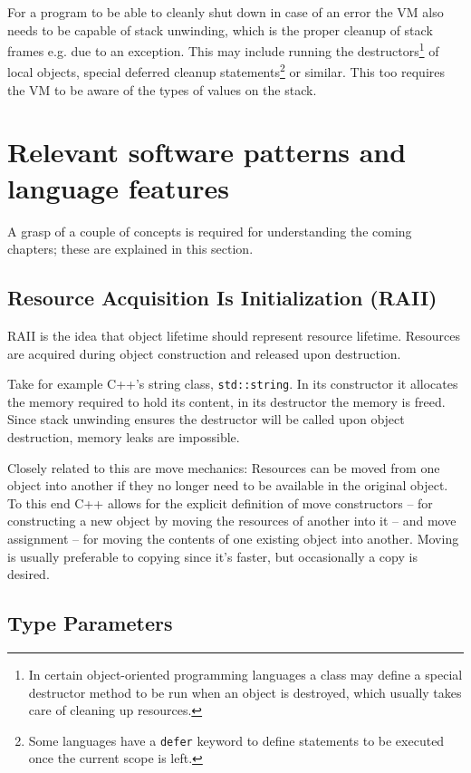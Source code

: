		For a program to be able to cleanly shut down in case of an error the VM also needs to be capable of stack unwinding, which is the proper cleanup of stack frames e.g. due to an exception. This may include running the destructors\footnote{In certain object-oriented programming languages a class may define a special destructor method to be run when an object is destroyed, which usually takes care of cleaning up resources.} of local objects, special deferred cleanup statements\footnote{Some languages have a \lstinline$defer$ keyword to define statements to be executed once the current scope is left.} or similar. This too requires the VM to be aware of the types of values on the stack.
	
	\section{Relevant software patterns and language features}
		
		A grasp of a couple of concepts is required for understanding the coming chapters; these are explained in this section.		
		
		\subsection{Resource Acquisition Is Initialization (RAII)}
		
		RAII is the idea that object lifetime should represent resource lifetime. Resources are acquired during object construction and released upon destruction.
		
		Take for example C++'s string class, \lstinline$std::string$. In its constructor it allocates the memory required to hold its content, in its destructor the memory is freed. Since stack unwinding ensures the destructor will be called upon object destruction, memory leaks are impossible.
		
		Closely related to this are move mechanics: Resources can be moved from one object into another if they no longer need to be available in the original object. To this end C++ allows for the explicit definition of move constructors -- for constructing a new object by moving the resources of another into it -- and move assignment -- for moving the contents of one existing object into another. Moving is usually preferable to copying since it's faster, but occasionally a copy is desired.
		
		\subsection{Type Parameters}
		

